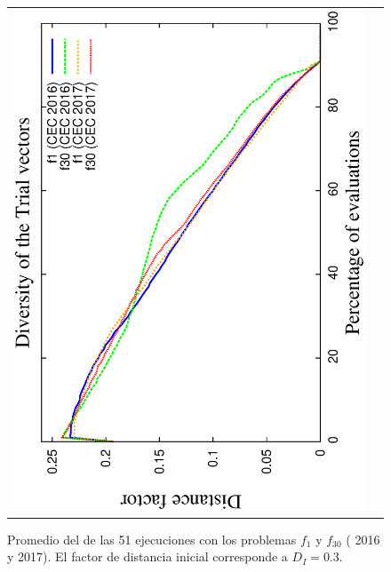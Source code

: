 \begin{figure}[!t]
\begin{tabular}{cc}
   \includegraphics[scale=0.23, angle=-90]{img/ED/Diversity_Trial.eps} 
\end{tabular}
\caption{ Promedio del \DCN{} de las 51 ejecuciones con los problemas $f_1$ y $f_{30}$ (\CEC{} 2016 y \CEC{} 2017). El factor de distancia inicial corresponde a $D_I=0.3$.}
\label{fig:diversity}
\end{figure}


